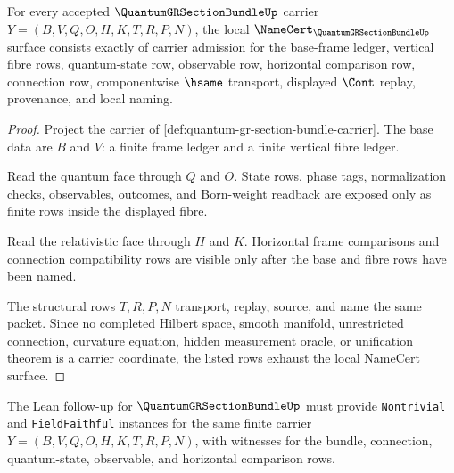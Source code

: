 \begin{theorem}
\label{thm:quantum-gr-section-bundle-namecert-obligations}
For every accepted $\QuantumGRSectionBundleUp$ carrier $Y=(B,V,Q,O,H,K,T,R,P,N)$, the local $\NameCert_{\QuantumGRSectionBundleUp}$ surface consists exactly of carrier admission for the base-frame ledger, vertical fibre rows, quantum-state row, observable row, horizontal comparison row, connection row, componentwise $\hsame$ transport, displayed $\Cont$ replay, provenance, and local naming.
\end{theorem}
\begin{proof}
Project the carrier of \autoref{def:quantum-gr-section-bundle-carrier}. The base data are $B$ and $V$: a finite frame ledger and a finite vertical fibre ledger.

Read the quantum face through $Q$ and $O$. State rows, phase tags, normalization checks, observables, outcomes, and Born-weight readback are exposed only as finite rows inside the displayed fibre.

Read the relativistic face through $H$ and $K$. Horizontal frame comparisons and connection compatibility rows are visible only after the base and fibre rows have been named.

The structural rows $T,R,P,N$ transport, replay, source, and name the same packet. Since no completed Hilbert space, smooth manifold, unrestricted connection, curvature equation, hidden measurement oracle, or unification theorem is a carrier coordinate, the listed rows exhaust the local NameCert surface.
\end{proof}

The Lean follow-up for $\QuantumGRSectionBundleUp$ must provide \texttt{Nontrivial} and \texttt{FieldFaithful} instances for the same finite carrier $Y=(B,V,Q,O,H,K,T,R,P,N)$, with witnesses for the bundle, connection, quantum-state, observable, and horizontal comparison rows.


